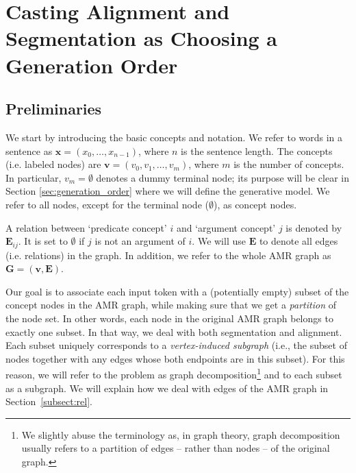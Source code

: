 \documentclass[11pt]{article}
\begin{document}
\section{Casting Alignment and Segmentation as Choosing a Generation Order} 
\subsection{Preliminaries}
\label{sec:seg_notation}


We start by introducing the basic concepts and notation. We refer to words in a sentence as $\mathbf{x} = (x_0,\ldots,x_{n-1})$, where $n$ is the sentence length. The concepts (i.e. labeled nodes) are $\mathbf{v} = (v_0,v_1, \ldots, v_m)$, where $m$ is the number of concepts.
In particular, $v_m= \emptyset $ denotes a dummy terminal node; its purpose will be clear in Section \ref{sec:generation_order} where we will define the generative model.  We refer to all nodes, except for the terminal node ($\emptyset$), as concept nodes. 

A relation between `predicate concept' $i$
and `argument concept' $j$ is denoted by $\mathbf{E}_{ij}$.  
It is set to $\emptyset $ if $j$ is not an argument of $i$.  We will use $\mathbf{E}$ to denote all edges (i.e. relations) in the graph. In addition, we refer to the whole AMR graph as $\mathbf{G}=(\mathbf{v},\mathbf{E})$. 


Our goal is to associate each input token with a (potentially empty) subset of the concept nodes in the AMR graph, while making sure that we get a {\it partition} of the node set. In other words, each node in the original AMR graph belongs to exactly one subset. In that way, we deal with both segmentation and alignment. 
Each subset uniquely corresponds to a {\it vertex-induced subgraph} (i.e., the subset of nodes together with any edges whose both endpoints are in this subset). For this reason, we will refer to the problem
as graph decomposition\footnote{We slightly abuse the terminology as, in graph theory,  graph decomposition usually refers to a partition of edges -- rather than nodes -- of the original graph.} 
and to each subset as a subgraph. 
We will explain how we deal with edges of the AMR graph in Section~\ref{subsect:rel}.
\end{document}

